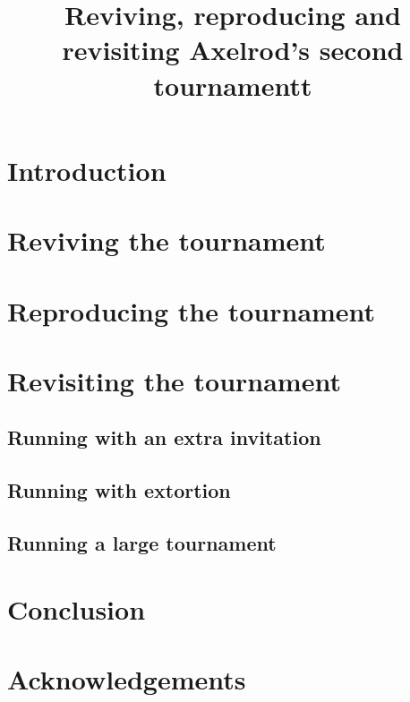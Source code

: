 \documentclass{article}
\title{Reviving, reproducing and revisiting Axelrod's second tournamentt}
\begin{document}
\section{Introduction}\label{sec:introduction}


\section{Reviving the tournament}\label{sec:reviving}


\section{Reproducing the tournament}\label{sec:reproducing}


\section{Revisiting the tournament}\label{sec:revisiting}

\subsection{Running with an extra invitation}\label{sec:extra_strategy}


\subsection{Running with extortion}\label{sec:run_with_stewart_plotkin}


\subsection{Running a large tournament}\label{sec:run_with_everyone}

\section{Conclusion}\label{sec:conclusion}

\section*{Acknowledgements}
\end{document}
